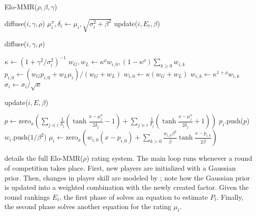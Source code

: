 \setlength{\floatsep}{0pt}
\setlength{\textfloatsep}{1em}
\begin{algorithm}[t]
\caption{Elo-MMR($\rho,\beta, \gamma$)}
\label{alg:main}
\begin{algorithmic}
\ENDIF
\STATE diffuse($i,\gamma,\rho$)
\STATE $\mu^\pi_i, \delta_i \gets \mu_i,\sqrt{\sigma_i^2 + \beta^2}$
\ENDFOR
\STATE update($i,E_t,\beta$)
\ENDFOR
\ENDFOR
\end{algorithmic}
\end{algorithm}
\begin{algorithm}[t]
\caption{diffuse($i,\gamma,\rho$)}
\label{alg:diffuse}
\begin{algorithmic}
\STATE $\kappa \gets (1+\gamma^2/\sigma_i^2)^{-1}$
\STATE $w_G, w_L \gets \kappa^\rho w_{i,0}, (1-\kappa^\rho) \sum_{k\geq 0} w_{i,k}$
\STATE $p_{i,0} \gets (w_G p_{i,0} + w_L \mu_i) / (w_G+w_L)$
\STATE $w_{i,0} \gets \kappa (w_G+w_L)$
\STATE $w_{i,k} \gets \kappa^{1+\rho}w_{i,k}$
\ENDFOR
\STATE $\sigma_i \gets \sigma_i / \sqrt\kappa$
\end{algorithmic}
\end{algorithm}
\begin{algorithm}[t]
\caption{update($i,E,\beta$)}
\label{alg:update}
\begin{algorithmic}
\STATE $p \gets \mathrm{zero}_x\left(\sum_{j\preceq i}\frac{1}{\delta_j}\left( \tanh\frac {x - \mu^\pi_j} {2\bar\delta_j} - 1 \right) + \sum_{j\succeq i}\frac{1}{\delta_j}\left( \tanh\frac {x - \mu^\pi_j} {2\bar\delta_j} + 1 \right)\right)$
\STATE $p_i$.push($p$)
\STATE $w_i$.push($1/\beta^2$)
\STATE $\mu_i \gets \mathrm{zero}_x\left(w_{i,0}(x-p_{i,0}) + \sum_{k>0} \frac{w_{i,k}\beta^2}{\bar\beta} \tanh \frac {x-p_{i,k}} {2\bar\beta}\right)$
\end{algorithmic}
\end{algorithm}

 details the full Elo-MMR($\rho$) rating system. The main loop runs whenever a round of competition takes place. First, new players are initialized with a Gaussian prior. Then, changes in player skill are modeled by ; note how the Gaussian prior is updated into a weighted combination with the newly created factor. Given the round rankings $E_t$, the first phase of  solves an equation to estimate $P_t$. Finally, the second phase solves another equation for the rating $\mu_t$. 

